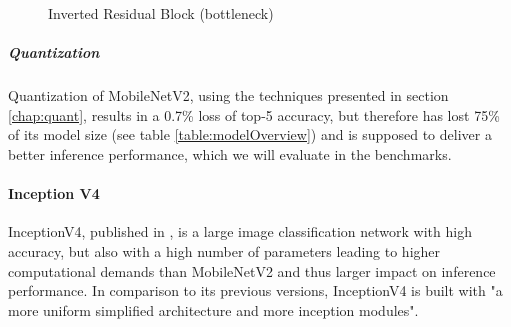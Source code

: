 \begin{figure}[!htb]
\centering
   \resizebox{.7\linewidth}{!}{}
\caption{Inverted Residual Block (bottleneck)}
\label{fig:bottleneckBlock}
\end{figure}

\subparagraph{Quantization}
Quantization of MobileNetV2, using the techniques presented in section \ref{chap:quant}, results in a  0.7\% loss of top-5 accuracy, but therefore has lost 75\% of its model size (see table \ref{table:modelOverview}) and is supposed to deliver a better inference performance, which we will evaluate in the benchmarks.



\paragraph{Inception V4}
InceptionV4, published in \cite{InceptionV4}, is a large image classification network with high accuracy, but also with a high number of parameters leading to higher computational demands than MobileNetV2 and thus larger impact on inference performance.
In comparison to its previous versions, InceptionV4 is built with "a more uniform simplified architecture and more inception modules"\cite{InceptionV4}. 

